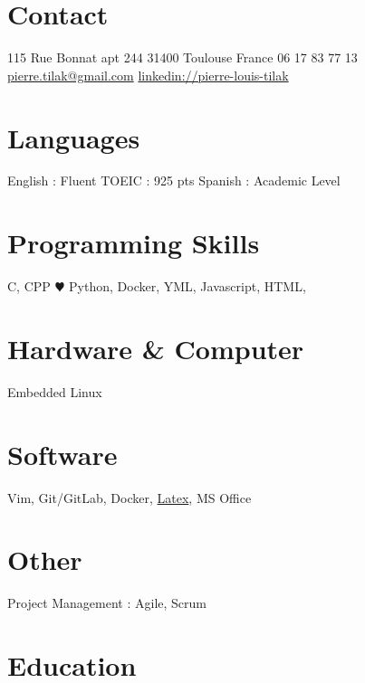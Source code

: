 \documentclass[a4paper]{friggeri-cv} %
\begin{document}


\begin{aside} %
\section{Contact}
115 Rue Bonnat apt 244
31400 Toulouse
France
06 17 83 77 13
~
\href{mailto:pierre.tilak@gmail.com}{pierre.tilak@gmail.com}
\href{https://www.linkedin.com/pub/pierre-louis-tilak/96/162/a83}{linkedin://pierre-louis-tilak}
\section{Languages}
English : Fluent
TOEIC : 925 pts 
Spanish : Academic Level\bigskip\bigskip
\section{Programming Skills}
C, CPP
{\color{red} $\varheartsuit$} Python, 
Docker, YML,
Javascript,
HTML,\bigskip\bigskip
\section{Hardware \& Computer}
Embedded Linux\bigskip\bigskip
\section{Software}
Vim, Git/GitLab, Docker, \href{https://github.com/tilaktilak/CV}{Latex}, MS Office\bigskip\bigskip
\section{Other}
Project Management : Agile, Scrum	
\end{aside}


\section{Education}
\end{document}
